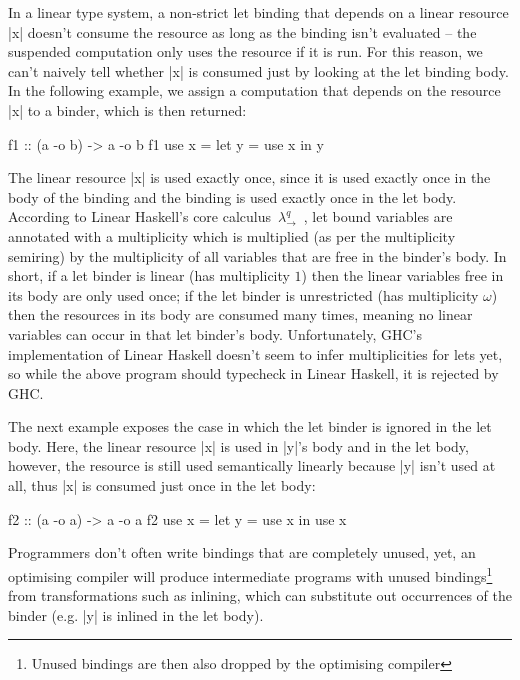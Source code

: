 \documentclass[acmsmall, screen, review]{acmart}
\begin{document}
In a linear type system, a non-strict let binding that depends on a linear
resource |x| doesn't consume the resource as long as the binding isn't
evaluated -- the suspended computation only uses the resource if it is run. For
this reason, we can't naively tell whether |x| is consumed just by looking at
the let binding body. In the following example, we assign a computation that
depends on the resource |x| to a binder, which is then returned:
%
\begin{notyet}
\begin{code}
f1 :: (a -o b) -> a -o b
f1 use x =
  let y = use x
   in y
\end{code}
\end{notyet}
%
The linear resource |x| is used exactly once, since it is used exactly once in
the body of the binding and the binding is used exactly once in the let body.
%
According to Linear Haskell's core calculus~$\lambda_{\to}^{q}$~\cite{cite:linearhaskell}, let
bound variables are annotated with a multiplicity which is multiplied (as per
the multiplicity semiring) by the multiplicity of all variables that are free
in the binder's body.
%
In short, if a let binder is linear (has
multiplicity $1$) then the linear variables free in its body are only used
once; if the let binder is unrestricted (has multiplicity $\omega$) then the
resources in its body are consumed many times, meaning no linear variables can
occur in that let binder's body.
%
Unfortunately, GHC's implementation of Linear
Haskell doesn't seem to infer multiplicities for lets yet, so while the above
program should typecheck in Linear Haskell, it is rejected by GHC.

The next example exposes the case in which the let binder is ignored in the let
body. Here, the linear resource |x| is used in |y|'s body and in the let
body, however, the resource is still used semantically linearly because |y| isn't used at all, thus |x| is consumed just once in the let body:
%
\begin{notyet}
\begin{code}
f2 :: (a -o a) -> a -o a
f2 use x =
  let y = use x
  in use x
\end{code}
\end{notyet}
%
Programmers don't often write bindings that are completely unused, yet, an
optimising compiler will produce intermediate programs with unused bindings\footnote{Unused bindings are then
also dropped by the optimising compiler} 
from transformations such as inlining, which can substitute out occurrences
of the binder (e.g. |y| is inlined in the let body).
\end{document}
